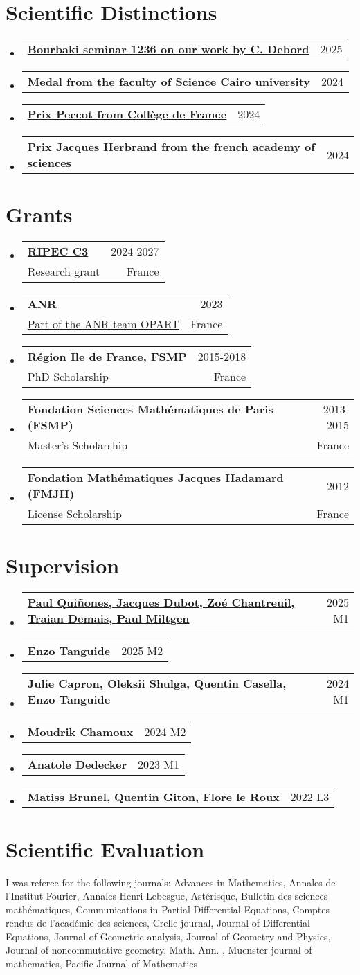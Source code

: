 \documentclass[A4,11pt]{article}
\makeatletter
\newcommand{\CVSubheading}[4]{
  \vspace{-2pt}\item
    \begin{tabular*}{0.97\textwidth}[t]{l@{\extracolsep{\fill}}r}
      \textbf{#1} & #2 \\
      \small#3 & \small #4 \\
    \end{tabular*}\vspace{-7pt}
}
\newcommand{\CVSubheadingshort}[2]{
  \vspace{-2pt}\item
    \begin{tabular*}{0.97\textwidth}[t]{l@{\extracolsep{\fill}}r}
      \textbf{#1} & #2 \\
    \end{tabular*}\vspace{-7pt}
}
\newcommand{\CVSubHeadingListStart}{\begin{itemize}[leftmargin=0.5cm, label={}]}
\newcommand{\CVSubHeadingListEnd}{\end{itemize}}
\makeatother
\begin{document}
  \section{Scientific Distinctions}
\CVSubHeadingListStart
\CVSubheadingshort{\href{https://www.bourbaki.fr/TEXTES/Exp1236-Debord.pdf}{\underline{Bourbaki seminar 1236 on our work by C. Debord}}}{2025}{}{}
\CVSubheadingshort{\href{}{Medal from the faculty of Science Cairo university}}{2024}{}{}
\CVSubheadingshort{\href{https://www.college-de-france.fr/fr/personne/omar-mohsen}{\underline{Prix Peccot from Collège de France}}}{2024}{}{}
   \CVSubheadingshort{\href{https://www.insmi.cnrs.fr/en/cnrsinfo/prix-academie-des-sciences-2024-mathematiques}{\underline{Prix Jacques Herbrand from the french academy of sciences}}}{2024}{}{}
\CVSubHeadingListEnd
 
\section{Grants}
  \CVSubHeadingListStart
  \CVSubheading
{\href{}{RIPEC C3}}{2024-2027}{Research grant}{France}
\CVSubheading
{ANR}{2023}
{\href{https://anr.fr/Project-ANR-23-CE40-0016}{\underline{Part of the ANR team OPART}}}{France}
    \CVSubheading
      {Région Ile de France, FSMP}{2015-2018}
      {PhD Scholarship}{France}
      \CVSubheading
      {Fondation Sciences Mathématiques de Paris (FSMP)}{2013-2015}
      {Master's Scholarship}{France}
       \CVSubheading
      {Fondation Mathématiques Jacques Hadamard (FMJH)}{2012}
      {License Scholarship}{France}
  \CVSubHeadingListEnd
  \section{Supervision}
  \CVSubHeadingListStart
  \CVSubheadingshort{\href{}{Paul Quiñones, Jacques Dubot, Zoé Chantreuil, Traian Demais, Paul Miltgen}}{2025 M1}
  \CVSubheadingshort
{\href{}{Enzo Tanguide}}{2025 M2}
\CVSubheadingshort
{Julie Capron, Oleksii Shulga, Quentin Casella, Enzo Tanguide}{2024 M1}
\CVSubheadingshort
{\href{}{Moudrik Chamoux}}{2024 M2}
    \CVSubheadingshort
      {Anatole Dedecker}{2023 M1}
      \CVSubheadingshort
      {Matiss Brunel, Quentin Giton, Flore le Roux}{2022 L3}

  \CVSubHeadingListEnd
  \section{Scientific Evaluation}
  I was referee for the following journals: Advances in Mathematics, Annales de l'Institut Fourier, Annales Henri Lebesgue, Astérisque, Bulletin des sciences mathématiques, Communications in Partial Differential Equations, Comptes rendus de l'académie des sciences, Crelle journal, Journal of Differential Equations, Journal of Geometric analysis, Journal of Geometry and Physics, Journal of noncommutative geometry, Math. Ann.  , Muenster journal of mathematics, Pacific Journal of Mathematics
  
\end{document}
